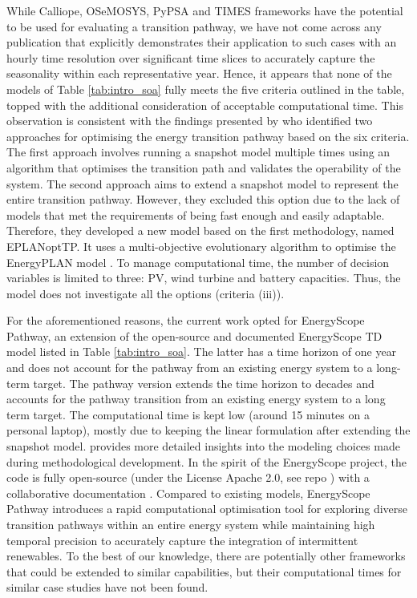 While Calliope, OSeMOSYS, PyPSA and TIMES frameworks have the potential to be used for evaluating a transition pathway, we have not come across any publication that explicitly demonstrates their application to such cases with an hourly time resolution over significant time slices to accurately capture the seasonality within each representative year. Hence, it appears that none of the models of Table \ref{tab:intro_soa} fully meets the five criteria outlined in the table, topped with the additional consideration of acceptable computational time. This observation is consistent with the findings presented by \citet{prina2019transition} who identified two approaches for optimising the energy transition pathway based on the six criteria. The first approach involves running a snapshot model multiple times using an algorithm that optimises the transition path and validates the operability of the system. The second approach aims to extend a snapshot model to represent the entire transition pathway. However, they excluded this option due to the lack of models that met the requirements of being fast enough and easily adaptable. 
Therefore, they developed a new model based on the first methodology, named EPLANoptTP. It uses a multi-objective evolutionary algorithm to optimise the EnergyPLAN model \cite{lundenergyplan}. To manage computational time, the number of decision variables is limited to three: \gls{PV}, wind turbine and battery capacities. Thus, the model does not investigate all the options (\ie criteria (iii)). 

For the aforementioned reasons, the current work opted for EnergyScope Pathway, an extension of the open-source and documented EnergyScope TD model \cite{limpens2019energyscope} listed in Table \ref{tab:intro_soa}. The latter has a time horizon of one year and does not account for the pathway from an existing energy system to a long-term target.  The pathway version extends the time horizon to decades and accounts for the pathway transition from an existing energy system to a long term target. The computational time is kept low (\ie around 15 minutes on a personal laptop), mostly due to keeping the linear formulation after extending the snapshot model. \citet{limpens2024pathway} provides more detailed insights into the modeling choices made during methodological development.
In the spirit of the EnergyScope project, the code is fully open-source (under the License Apache 2.0, see repo \cite{PESTD_v1_repo}) with a collaborative documentation \cite{readthedocs_pathway}. Compared to existing models, EnergyScope Pathway introduces a rapid computational optimisation tool for exploring diverse transition pathways within an entire energy system while maintaining high temporal precision to accurately capture the integration of intermittent renewables. To the best of our knowledge, there are potentially other frameworks that could be extended to similar capabilities, but their computational times for similar case studies have not been found. 

